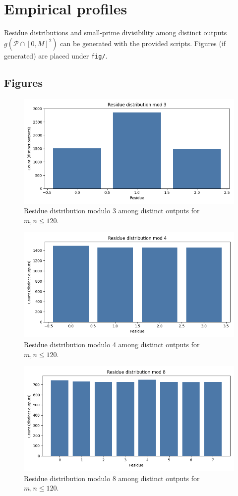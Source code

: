 \documentclass[12pt]{article}
\theoremstyle{definition}
\theoremstyle{plain}
\theoremstyle{remark}
\begin{document}
\section{Empirical profiles}
Residue distributions and small-prime divisibility among distinct outputs \(g(\mathcal{P}\cap[0,M]^2)\) can be generated with the provided scripts. Figures (if generated) are placed under \texttt{fig/}.

\subsection*{Figures}
\begin{figure}[h]
\centering
\includegraphics[width=0.7\linewidth]{../fig/residues_mod_3.png}
\caption{Residue distribution modulo 3 among distinct outputs for \(m,n\le 120\).}
\label{fig:u-mod3}
\end{figure}

\begin{figure}[h]
\centering
\includegraphics[width=0.7\linewidth]{../fig/residues_mod_4.png}
\caption{Residue distribution modulo 4 among distinct outputs for \(m,n\le 120\).}
\label{fig:u-mod4}
\end{figure}

\begin{figure}[h]
\centering
\includegraphics[width=0.7\linewidth]{../fig/residues_mod_8.png}
\caption{Residue distribution modulo 8 among distinct outputs for \(m,n\le 120\).}
\label{fig:u-mod8}
\end{figure}
\end{document}
